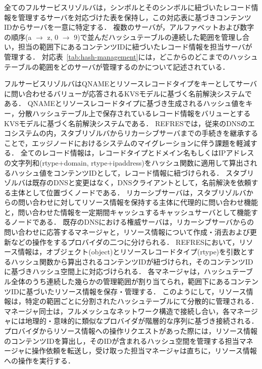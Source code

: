 全てのフルサービスリゾルバは，シンボルとそのシンボルに紐づいたレコード情報を管理するサーバを対応づけた表を保持し，この対応表に基づきコンテンツIDからサーバを一意に特定する．
複数のサーバが，アルファベットおよび数字の順序(a $\rightarrow$ z, 0 $\rightarrow$ 9)で並んだハッシュテーブルの連続した範囲を管理し合い，担当の範囲下にあるコンテンツIDに紐づいたレコード情報を担当サーバが管理する．
対応表~\ref{tab:hash-management}には，どこからのどこまでのハッシュテーブルの範囲をどのサーバが管理するのかについて記述されている．

フルサービスリゾルバはQNAMEとリソースレコードタイプをキーとしてサーバに問い合わせるバリューが応答されるKVSモデルに基づく名前解決システムである．
QNAMEとリソースレコードタイプに基づき生成されるハッシュ値をキー，分散ハッシュテーブル上で保存されているレコード情報をバリューとするKVSモデルに基づく名前解決システムである．
REFRESでは，従来のDNSのエコシステムの内，スタブリゾルバからリカーシブサーバまでの手続きを継承することで，エッジノードにおけるシステムのマイグレーションに伴う課題を軽減する．
全てのレコード情報は，レコードタイプとドメイン名もしくはIPアドレスの文字列和(rtype+domain, rtype+ipaddress)をハッシュ関数に適用して算出されるハッシュ値をコンテンツIDとして，レコード情報に紐づけられる．
スタブリゾルバは既存のDNSと変更はなく，DNSクライアントとして，名前解決を依頼する主体として位置づくノードである．
リカーシブサーバは，スタブリゾルバからの問い合わせに対してリソース情報を保持する主体に代理的に問い合わせ機能と，問い合わせた情報を一定期間キャッシュするキャッシュサーバとして機能するノードである．
既存のDNSにおける権威サーバは，リカーシブサーバからの問い合わせに応答するマネージャと，リソース情報について作成・消去および更新などの操作をするプロバイダの二つに分けられる．
REFRESにおいて，リソース情報は，オブジェクト(object)とリソースレコードタイプ(rtype)を引数とするハッシュ関数から算出されるコンテンツIDが紐づけられ，そのコンテンツIDに基づきハッシュ空間上に対応づけられる．
各マネージャは，ハッシュテーブル全体のうち連続した幾らかの管理範囲が割り当てられ，範囲下にあるコンテンツIDに基づいたリソース情報を保存・管理する．
このようにして，リソース情報は，特定の範囲ごとに分割されたハッシュテーブルにて分散的に管理される．
マネージャ同士は，フルメッシュなネットワーク構造で接続し合い，各マネージャには地理的・意味的に類似なプロバイダが階層的な序列に基づき接続される．
プロバイダからリソース情報への操作リクエストがあった際には，リソース情報のコンテンツIDを算出し，そのIDが含まれるハッシュ空間を管理する担当マネージャに操作依頼を転送し，受け取った担当マネージャは直ちに，リソース情報への操作を実行する．



